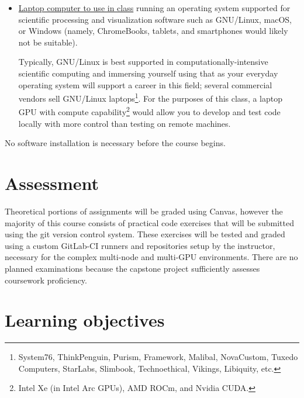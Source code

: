 \documentclass[12pt]{article}
\begin{document}
\begin{itemize}
\item \ul{Laptop computer to use in class} running an operating system %
  supported for scientific processing and visualization software %
  such as GNU/Linux, macOS, or Windows %
  (namely, ChromeBooks, tablets, and smartphones would likely not be suitable).

  Typically, %
  GNU/Linux is best supported %
  in computationally-intensive scientific computing %
  and immersing yourself using that as your everyday operating system %
  will support a career in this field; %
  several commercial vendors sell GNU/Linux laptops\footnote{%
  System76, ThinkPenguin, Purism, %
  Framework, Malibal, %
  NovaCustom, Tuxedo Computers, StarLabs, Slimbook, %
  Technoethical, Vikings, Libiquity, etc.}.
  For the purposes of this class, %
  a laptop GPU with compute capability\footnote{%
  Intel Xe (in Intel Arc GPUs), AMD ROCm, and Nvidia CUDA.} %
  would allow you to develop and test code locally %
  with more control than testing on remote machines.
\end{itemize}

\noindent
No software installation is necessary before the course begins.

\section{Assessment}

Theoretical portions of assignments will be graded using Canvas, %
however the majority of this course %
consists of practical code exercises %
that will be submitted using the git version control system.
%
These exercises will be tested and graded using %
a custom GitLab-CI runners and repositories %
setup by the instructor, %
necessary for the complex multi-node and multi-GPU environments.
%
There are no planned examinations %
because the capstone project %
sufficiently assesses coursework proficiency.

\section{Learning objectives}
\end{document}
